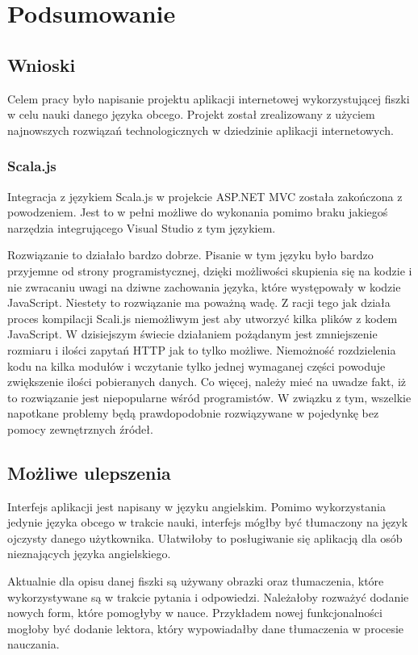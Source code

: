 \newpage
{\let\cleardoublepage\relax \chapter{Podsumowanie}}
\label{cha:summary}

\section{Wnioski}

Celem pracy było napisanie projektu aplikacji internetowej wykorzystującej fiszki w celu nauki danego języka obcego. Projekt został zrealizowany z użyciem najnowszych rozwiązań technologicznych w dziedzinie aplikacji internetowych. 



 
\subsection{Scala.js}

Integracja z językiem Scala.js w projekcie ASP.NET MVC została zakończona z powodzeniem. Jest to w pełni możliwe do wykonania pomimo braku jakiegoś narzędzia integrującego Visual Studio z tym językiem. 

Rozwiązanie to działało bardzo dobrze. Pisanie w tym języku było bardzo przyjemne od strony programistycznej, dzięki możliwości skupienia się na kodzie i nie zwracaniu uwagi na dziwne zachowania języka, które występowały w kodzie JavaScript.
Niestety to rozwiązanie ma poważną wadę. Z racji tego jak działa proces kompilacji Scali.js niemożliwym jest aby utworzyć kilka plików z kodem JavaScript. W dzisiejszym świecie działaniem pożądanym jest zmniejszenie rozmiaru i ilości zapytań HTTP jak to tylko możliwe. Niemożność rozdzielenia kodu na kilka modułów i wczytanie tylko jednej wymaganej części powoduje zwiększenie ilości pobieranych danych.
Co więcej, należy mieć na uwadze fakt, iż to rozwiązanie jest niepopularne wśród programistów. W związku z tym, wszelkie napotkane problemy będą prawdopodobnie rozwiązywane w pojedynkę bez pomocy zewnętrznych źródeł.

\section{Możliwe ulepszenia}

Interfejs aplikacji jest napisany w języku angielskim. Pomimo wykorzystania jedynie języka obcego w trakcie nauki, interfejs mógłby być tłumaczony na język ojczysty danego użytkownika. Ułatwiłoby to posługiwanie się aplikacją dla osób nieznających języka angielskiego.

Aktualnie dla opisu danej fiszki są używany obrazki oraz tłumaczenia, które wykorzystywane są w trakcie pytania i odpowiedzi. Należałoby rozważyć dodanie nowych form, które pomogłyby w nauce. Przykładem nowej funkcjonalności mogłoby być dodanie lektora, który wypowiadałby dane tłumaczenia w procesie nauczania.